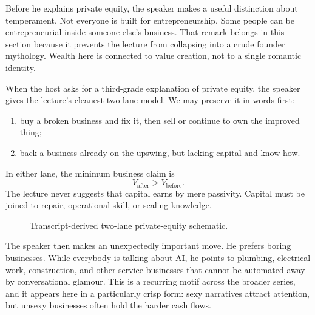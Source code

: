 Before he explains private equity, the speaker makes a useful distinction about temperament. Not everyone is built for entrepreneurship. Some people can be entrepreneurial inside someone else's business. That remark belongs in this section because it prevents the lecture from collapsing into a crude founder mythology. Wealth here is connected to value creation, not to a single romantic identity.

When the host asks for a third-grade explanation of private equity, the speaker gives the lecture's cleanest two-lane model. We may preserve it in words first:
\begin{enumerate}
\item buy a broken business and fix it, then sell or continue to own the improved thing;
\item back a business already on the upswing, but lacking capital and know-how.
\end{enumerate}
In either lane, the minimum business claim is
\begin{equation}
V_{\text{after}} > V_{\text{before}}.
\end{equation}
The lecture never suggests that capital earns by mere passivity. Capital must be joined to repair, operational skill, or scaling knowledge.

\begin{figure}[h]
\centering
{}
\caption{Transcript-derived two-lane private-equity schematic.}
\end{figure}

The speaker then makes an unexpectedly important move. He prefers boring businesses. While everybody is talking about AI, he points to plumbing, electrical work, construction, and other service businesses that cannot be automated away by conversational glamour. This is a recurring motif across the broader series, and it appears here in a particularly crisp form: sexy narratives attract attention, but unsexy businesses often hold the harder cash flows.

